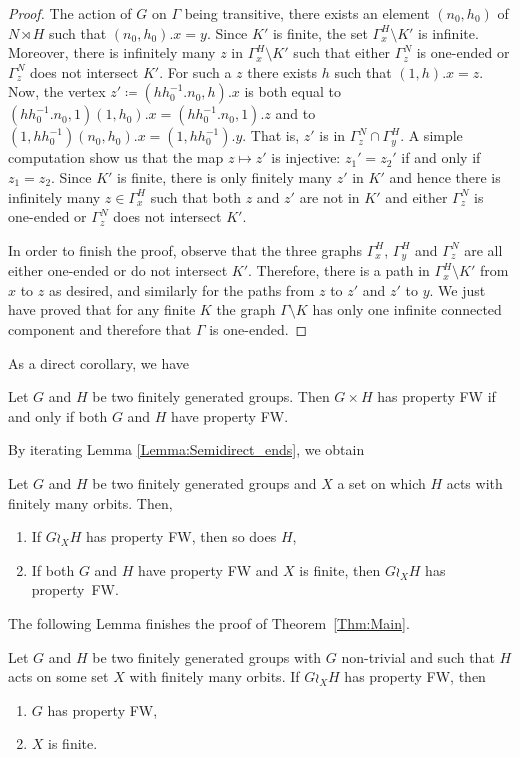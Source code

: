 \begin{proof}
The action of $G$ on $\Gamma$ being transitive, there exists an element $(n_0,h_0)$ of $N \rtimes H$ such that $(n_0,h_0).x = y$.
Since $K'$ is finite, the set $\Gamma_x^H\setminus K'$ is infinite.
Moreover, there is infinitely many $z$ in $\Gamma_x^H\setminus K'$ such that either $\Gamma_z^N$ is one-ended or $\Gamma_z^N$ does not intersect $K'$.
For such a $z$ there exists $h$ such that $(1,h).x=z$.
Now, the vertex $z'\coloneqq(hh_0^{-1}.n_0,h).x$ is both equal to $(hh_0^{-1}.n_0,1)(1,h_0).x=(hh_0^{-1}.n_0,1).z$ and to $(1,hh_0^{-1})(n_0,h_0).x=(1,hh_0^{-1}).y$. That is, $z'$ is in $\Gamma_z^N\cap \Gamma_y^H$.
A simple computation show us that the map $z\mapsto z'$ is injective: $z_1'=z_2'$ if and only if $z_1=z_2$.
Since $K'$ is finite, there is only finitely many $z'$ in $K'$ and hence there is infinitely many $z\in \Gamma_x^H$ such that both $z$ and $z'$ are not in $K'$ and either $\Gamma_z^N$ is one-ended or $\Gamma_z^N$ does not intersect $K'$.

In order to finish the proof, observe that the three graphs $\Gamma_x^H$, $\Gamma_y^H$ and $\Gamma_z^N$ are all either one-ended or do not intersect $K'$.
Therefore, there is a path in $\Gamma_x^H\setminus K'$ from $x$ to $z$ as desired, and similarly for the paths from $z$ to $z'$ and $z'$ to $y$.
We just have proved that for any finite $K$ the graph $\Gamma\setminus K$ has only one infinite connected component and therefore that $\Gamma$ is one-ended.
\end{proof}
%
%
As a direct corollary, we have
\begin{cor}
Let $G$ and $H$ be two finitely generated groups. Then $G\times H$ has property FW if and only if both $G$ and $H$ have property FW.
\end{cor}
%
%
By iterating Lemma \ref{Lemma:Semidirect_ends}, we obtain
%
%
\begin{cor}\label{Cor:Wreath_ends}
Let $G$ and $H$ be two finitely generated groups and $X$ a set on which $H$ acts with finitely many orbits. Then,
\begin{enumerate}
\item
If $G\wr_X H$ has property FW, then so does $H$,
\item
If both $G$ and $H$ have property FW and $X$ is finite, then $G\wr_X H$ has property~FW.
\end{enumerate}
\end{cor}
%
%
The following Lemma finishes the proof of Theorem~\ref{Thm:Main}.
%
%
\begin{lem}\label{Lem:Wreath_groups_ends}
Let $G$ and $H$ be two finitely generated groups with $G$ non-trivial and such that $H$ acts on some set $X$ with finitely many orbits.
If $G\wr_XH$ has property FW, then
\begin{enumerate}
\item $G$ has property FW,
\item $X$ is finite.
\end{enumerate}
\end{lem}
